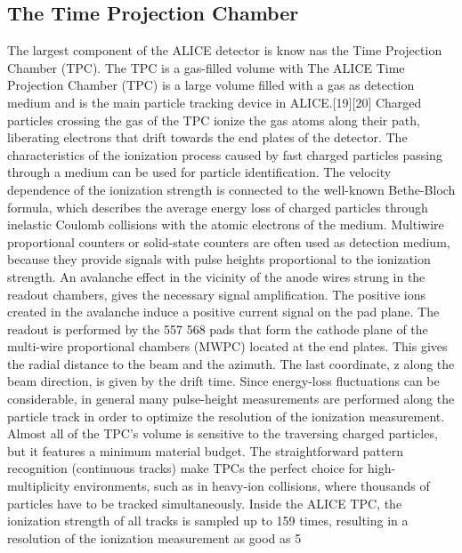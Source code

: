 \subsection{The Time Projection Chamber}
The largest component of the ALICE detector is know nas the Time Projection Chamber (TPC). The TPC is a gas-filled volume with 
The ALICE Time Projection Chamber (TPC) is a large volume filled with a gas as detection medium and is the main particle tracking device in ALICE.[19][20]
Charged particles crossing the gas of the TPC ionize the gas atoms along their path, liberating electrons that drift towards the end plates of the detector. The characteristics of the ionization process caused by fast charged particles passing through a medium can be used for particle identification. The velocity dependence of the ionization strength is connected to the well-known Bethe-Bloch formula, which describes the average energy loss of charged particles through inelastic Coulomb collisions with the atomic electrons of the medium.
Multiwire proportional counters or solid-state counters are often used as detection medium, because they provide signals with pulse heights proportional to the ionization strength. An avalanche effect in the vicinity of the anode wires strung in the readout chambers, gives the necessary signal amplification. The positive ions created in the avalanche induce a positive current signal on the pad plane. The readout is performed by the 557 568 pads that form the cathode plane of the multi-wire proportional chambers (MWPC) located at the end plates. This gives the radial distance to the beam and the azimuth. The last coordinate, z along the beam direction, is given by the drift time. Since energy-loss fluctuations can be considerable, in general many pulse-height measurements are performed along the particle track in order to optimize the resolution of the ionization measurement.
Almost all of the TPC's volume is sensitive to the traversing charged particles, but it features a minimum material budget. The straightforward pattern recognition (continuous tracks) make TPCs the perfect choice for high-multiplicity environments, such as in heavy-ion collisions, where thousands of particles have to be tracked simultaneously. Inside the ALICE TPC, the ionization strength of all tracks is sampled up to 159 times, resulting in a resolution of the ionization measurement as good as 5%

